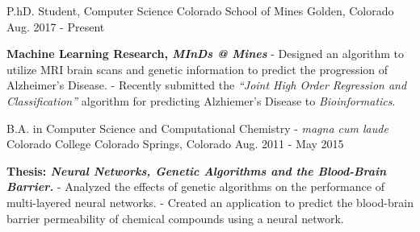 

\begin{cventries}

  \cventry
    {P.hD. Student, Computer Science}
    {Colorado School of Mines}
    {Golden, Colorado}
    {Aug. 2017 - Present}
    {
      \begin{cvitems}
      \item {\textbf{Machine Learning Research, \textit{MInDs @ Mines}}
          \subitem - Designed an algorithm to utilize MRI brain scans and genetic information to predict the progression of Alzheimer's Disease.}
          \subitem - Recently submitted the \textit{``Joint High Order Regression and Classification''} algorithm for predicting Alzhiemer's Disease to \textit{Bioinformatics}.
      \end{cvitems}
    }

  \cventry
    {B.A. in Computer Science and Computational Chemistry - \textit{magna cum laude}} %
    {Colorado College} %
    {Colorado Springs, Colorado} %
    {Aug. 2011 - May 2015} %
    {
      \begin{cvitems} %
      \item {\textbf{Thesis: \textit{Neural Networks, Genetic Algorithms and the Blood-Brain Barrier.}} 
          \subitem - Analyzed the effects of genetic algorithms on the performance of multi-layered neural networks. 
          \subitem - Created an application to predict the blood-brain barrier permeability of chemical compounds using a neural network.}
      \end{cvitems}
    }

\end{cventries}
